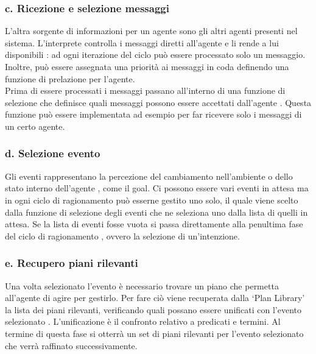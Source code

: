 \subsubsection{c. Ricezione e selezione messaggi}
L'altra sorgente di informazioni per un agente sono gli altri agenti presenti nel sistema. L'interprete controlla i messaggi diretti all'agente e li rende a lui disponibili \cite{AgentSpeakInJason}: ad ogni iterazione del ciclo può essere processato solo un messaggio. Inoltre, può essere assegnata una priorità ai messaggi in coda definendo una funzione di prelazione per l'agente.
\\
Prima di essere processati i messaggi passano all'interno di una funzione di selezione che definisce quali messaggi possono essere accettati dall'agente \cite{AgentSpeakInJason}. Questa funzione può essere implementata ad esempio per far ricevere solo i messaggi di un certo agente.

\subsubsection{d. Selezione evento}
Gli eventi rappresentano la percezione del cambiamento nell'ambiente o dello stato interno dell'agente \cite{AgentSpeakInJason}, come il goal. Ci possono essere vari eventi in attesa ma in ogni ciclo di ragionamento può esserne gestito uno solo, il quale viene scelto dalla funzione di selezione degli eventi che ne seleziona uno dalla lista di quelli in attesa. Se la lista di eventi fosse vuota si passa direttamente alla penultima fase del ciclo di ragionamento \cite{AgentSpeakInJason}, ovvero la selezione di un'intenzione.

\subsubsection{e. Recupero piani rilevanti}
Una volta selezionato l'evento è necessario trovare un piano che permetta all'agente di agire per gestirlo. Per fare ciò viene recuperata dalla `Plan Library' la lista dei piani rilevanti, verificando quali possano essere unificati con l'evento selezionato \cite{AgentSpeakInJason}. L'unificazione è il confronto relativo a predicati e termini. Al termine di questa fase si otterrà un set di piani rilevanti per l'evento selezionato che verrà raffinato successivamente.

